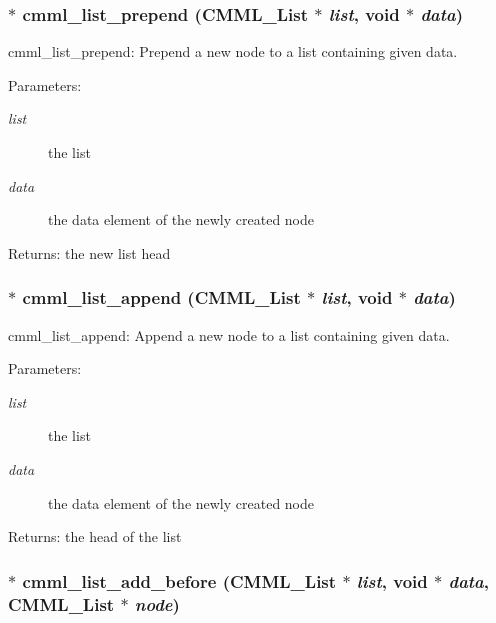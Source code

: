 \subsubsection{$\ast$ cmml\_\-list\_\-prepend ({\bf CMML\_\-List} $\ast$ {\em list}, void $\ast$ {\em data})}\label{cmml_8h_a86}


cmml\_\-list\_\-prepend: Prepend a new node to a list containing given data.

\begin{Desc}
\item[Parameters:]
\begin{description}
\item[{\em list}]the list \item[{\em data}]the data element of the newly created node\end{description}
\end{Desc}
\begin{Desc}
\item[Returns:]the new list head \end{Desc}
\subsubsection{$\ast$ cmml\_\-list\_\-append ({\bf CMML\_\-List} $\ast$ {\em list}, void $\ast$ {\em data})}\label{cmml_8h_a87}


cmml\_\-list\_\-append: Append a new node to a list containing given data.

\begin{Desc}
\item[Parameters:]
\begin{description}
\item[{\em list}]the list \item[{\em data}]the data element of the newly created node\end{description}
\end{Desc}
\begin{Desc}
\item[Returns:]the head of the list \end{Desc}
\subsubsection{$\ast$ cmml\_\-list\_\-add\_\-before ({\bf CMML\_\-List} $\ast$ {\em list}, void $\ast$ {\em data}, {\bf CMML\_\-List} $\ast$ {\em node})}\label{cmml_8h_a88}


